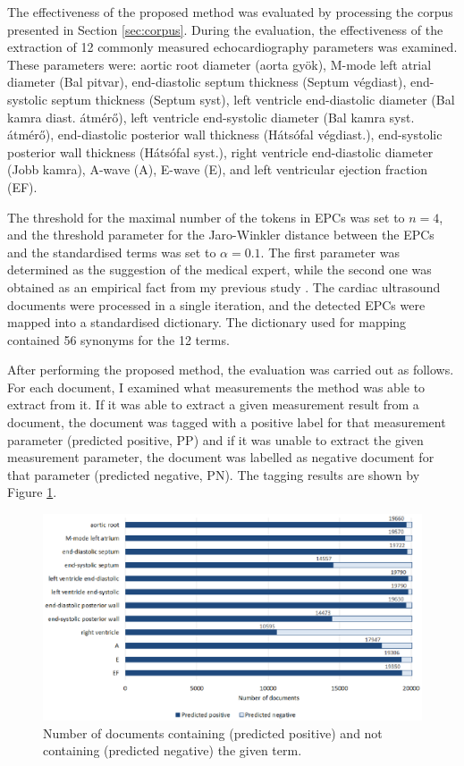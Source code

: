 The effectiveness of the proposed method was evaluated by processing the corpus presented in Section \ref{sec:corpus}. During the evaluation, the effectiveness of the extraction of 12 commonly measured echocardiography parameters was examined. These parameters were: aortic root diameter (aorta gyök), M-mode left atrial diameter (Bal pitvar), end-diastolic septum thickness (Septum végdiast), end-systolic septum thickness (Septum syst), left ventricle end-diastolic diameter (Bal kamra diast. átmérő), left ventricle end-systolic diameter (Bal kamra syst. átmérő), end-diastolic posterior wall thickness (Hátsófal végdiast.), end-systolic posterior wall thickness (Hátsófal syst.), right ventricle end-diastolic diameter (Jobb kamra), A-wave (A), E-wave (E), and left ventricular ejection fraction (EF). 

The threshold for the maximal number of the tokens in EPCs was set to $n=4$, and the threshold parameter for the Jaro-Winkler distance between the EPCs and the standardised terms was set to $\alpha=0.1$. The first parameter was determined as the suggestion of the medical expert, while the second one was obtained as an empirical fact from my previous study \cite{vathy2020efficiency}. The cardiac ultrasound documents were processed in a single iteration, and the detected EPCs were mapped into a standardised dictionary. The dictionary used for mapping contained 56 synonyms for the 12 terms. 

After performing the proposed method, the evaluation was carried out as follows. For each document, I examined what measurements the method was able to extract from it. If it was able to extract a given measurement result from a document, the document was tagged with a positive label for that measurement parameter (predicted positive, PP) and if it was unable to extract the given measurement parameter, the document was labelled as negative document for that parameter (predicted negative, PN). The tagging results are shown by Figure \ref{fig:ppv_and_npv_values}.

\begin{figure}[h]
	\centering
        \captionsetup{justification=centering}
	\includegraphics[width=\textwidth]{assets/figures/text_mining/extraction/ppv_npv.eps}
	\caption{Number of documents containing (predicted positive) and not containing (predicted negative) the given term. %
 }
	\label{fig:ppv_and_npv_values} 
\end{figure}

